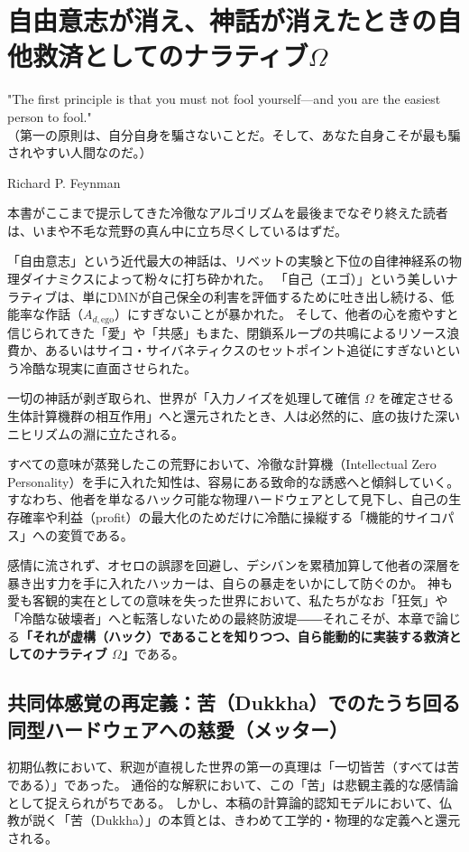 \chapter{自由意志が消え、神話が消えたときの自他救済としてのナラティブ$\Omega$}
\epigraph{"The first principle is that you must not fool yourself—and you are the easiest person to fool."\\
（第一の原則は、自分自身を騙さないことだ。そして、あなた自身こそが最も騙されやすい人間なのだ。）}{Richard P. Feynman}

本書がここまで提示してきた冷徹なアルゴリズムを最後までなぞり終えた読者は、いまや不毛な荒野の真ん中に立ち尽くしているはずだ。

「自由意志」という近代最大の神話は、リベットの実験と下位の自律神経系の物理ダイナミクスによって粉々に打ち砕かれた。
「自己（エゴ）」という美しいナラティブは、単にDMNが自己保全の利害を評価するために吐き出し続ける、低能率な作話（$A_{d,\mathrm{ego}}$）にすぎないことが暴かれた。
そして、他者の心を癒やすと信じられてきた「愛」や「共感」もまた、閉鎖系ループの共鳴によるリソース浪費か、あるいはサイコ・サイバネティクスのセットポイント追従にすぎないという冷酷な現実に直面させられた。

一切の神話が剥ぎ取られ、世界が「入力ノイズを処理して確信 $\Omega$ を確定させる生体計算機群の相互作用」へと還元されたとき、人は必然的に、底の抜けた深いニヒリズムの淵に立たされる。

すべての意味が蒸発したこの荒野において、冷徹な計算機（Intellectual Zero Personality）を手に入れた知性は、容易にある致命的な誘惑へと傾斜していく。
すなわち、他者を単なるハック可能な物理ハードウェアとして見下し、自己の生存確率や利益（profit）の最大化のためだけに冷酷に操縦する「機能的サイコパス」への変質である。

感情に流されず、オセロの誤謬を回避し、デシバンを累積加算して他者の深層を暴き出す力を手に入れたハッカーは、自らの暴走をいかにして防ぐのか。
神も愛も客観的実在としての意味を失った世界において、私たちがなお「狂気」や「冷酷な破壊者」へと転落しないための最終防波堤――それこそが、本章で論じる\textbf{「それが虚構（ハック）であることを知りつつ、自ら能動的に実装する救済としてのナラティブ $\Omega$」}である。

\section{共同体感覚の再定義：苦（Dukkha）でのたうち回る同型ハードウェアへの慈愛（メッター）}

初期仏教において、釈迦が直視した世界の第一の真理は「一切皆苦（すべては苦である）」であった。
通俗的な解釈において、この「苦」は悲観主義的な感情論として捉えられがちである。
しかし、本稿の計算論的認知モデルにおいて、仏教が説く「苦（Dukkha）」の本質とは、きわめて工学的・物理的な定義へと還元される。

